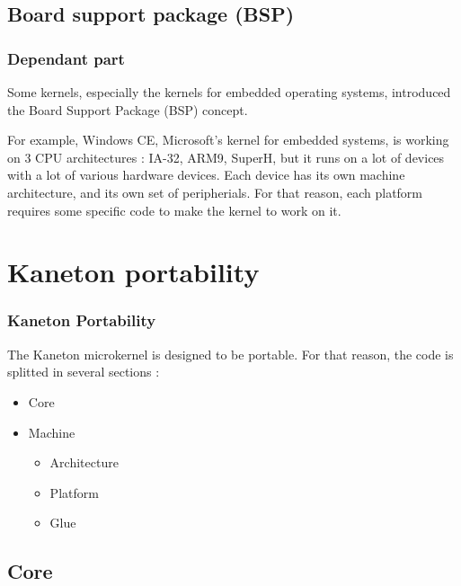 \subsection{Board support package (BSP)}

\begin{frame}
  \frametitle{Dependant part}

  Some kernels, especially the kernels for embedded operating systems, introduced the Board Support Package (BSP) concept.
  
  \-

  For example, Windows CE, Microsoft's kernel for embedded systems, is working on 3 CPU architectures : IA-32, ARM9, SuperH, but it runs on a lot of devices with a lot of various hardware devices. Each device has its own machine architecture, and its own set of peripherials. For that reason, each platform requires some specific code to make the kernel to work on it.

\end{frame}


\section{Kaneton portability}

\begin{frame}
  \frametitle{Kaneton Portability}

  The Kaneton microkernel is designed to be portable. For that reason, the code is splitted in several sections :

  \begin{itemize}
  \item Core
  \item Machine
  \begin{itemize}
  \item Architecture
  \item Platform
  \item Glue
  \end{itemize}
  \end{itemize}

\end{frame}

\subsection{Core}

